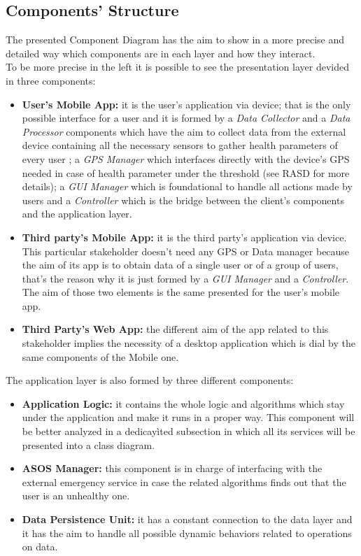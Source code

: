 \subsection{Components' Structure}
The presented Component Diagram has the aim to show in a more precise and detailed way which components are in each layer and how they interact.\\
To be more precise in the left it is possible to see the presentation layer devided in three components:
\begin{itemize}
	\item \textbf {User's Mobile App:} it is the user's application via device; that is the only possible interface for a user and it is 			formed by a \textit {Data Collector} and a \textit {Data Processor} components which have the aim to collect data from the 			external device containing all the necessary sensors to gather health parameters of every user ; a \textit {GPS Manager} 			which interfaces directly with the device's GPS needed in case of health parameter under the threshold (see RASD for 				more details); a \textit {GUI Manager} which is foundational to handle all actions made by users and a \textit {Controller} 			which is the bridge between the client's components and the application layer.
	\item \textbf {Third party's Mobile App:} it is the third party's application via device. This particular stakeholder doesn't need 			any GPS or Data manager because the aim of its app is to obtain data  of a single user or of a group of users, that's the 			reason why it is just formed by a \textit{ GUI Manager} and a \textit {Controller}. The aim of those two elements is the same 			presented for the user's mobile app.
	\item \textbf {Third Party's Web App:} the different aim of the app related to this stakeholder implies the necessity of a 			desktop application which is dial by the same components of the Mobile one.
\end{itemize}The application layer is also formed by three different components:
\begin{itemize}
	\item \textbf{Application Logic:} it contains the whole logic and algorithms which stay under the application and make it runs in 			a proper way. This component will be better analyzed in a dedicayìted subsection in which all its services will be presented into 			a class diagram. 
	\item \textbf{ ASOS Manager:} this component is in charge of interfacing with the external emergency service in case the 			related algorithms finds out that the user is an unhealthy one.
	\item \textbf{Data Persistence Unit:} it has a constant connection to the data layer and it has the aim to handle all possible 			dynamic behaviors related to operations on data.
\end{itemize}

